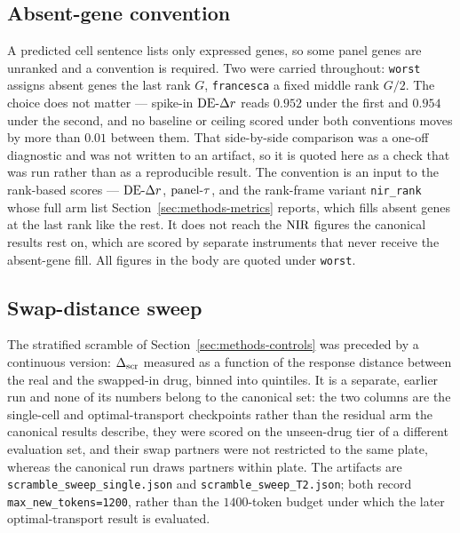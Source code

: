 \subsection{Absent-gene convention}
\label{sec:app-convention}

A predicted cell sentence lists only expressed genes, so some panel genes are unranked and a
convention is required. Two were carried throughout: \texttt{worst} assigns absent genes the last
rank $G$, \texttt{francesca} a fixed middle rank $G/2$. The choice does not matter --- spike-in
$\textrm{DE-}\Delta r$ reads $0.952$ under the first and $0.954$ under the second, and no baseline or ceiling scored
under both conventions moves by more than $0.01$ between them. That side-by-side comparison was a
one-off diagnostic and was not written to an artifact, so it is quoted here as a check that was run
rather than as a reproducible result. The convention is an input to the rank-based scores ---
$\textrm{DE-}\Delta r$, $\textrm{panel-}\tau$, and the rank-frame variant \texttt{nir\_rank} whose full arm list
Section~\ref{sec:methods-metrics} reports, which fills absent genes at the last rank like the rest.
It does not reach the $\textrm{NIR}$ figures the canonical results rest on, which are scored by separate
instruments that never receive the absent-gene fill. All figures in the body are quoted under
\texttt{worst}.

\subsection{Swap-distance sweep}
\label{sec:app-sweep}

The stratified scramble of Section~\ref{sec:methods-controls} was preceded by a continuous version:
$\Delta_{\textrm{scr}}$ measured as a function of the response distance between the real and the swapped-in drug,
binned into quintiles. It is a separate, earlier run and none of its numbers belong to the
canonical set: the two columns are the single-cell and optimal-transport checkpoints rather than the
residual arm the canonical results describe, they were scored on the unseen-drug tier of a different
evaluation set, and their swap partners were not restricted to the same plate, whereas the canonical
run draws partners within plate. The artifacts are \texttt{scramble\_sweep\_single.json} and
\texttt{scramble\_sweep\_T2.json}; both record \texttt{max\_new\_tokens=1200}, rather than the
$1400$-token budget under which the later optimal-transport result is evaluated.

